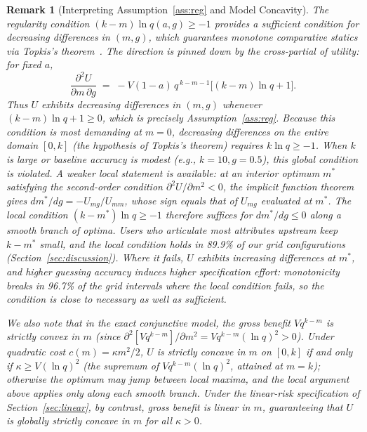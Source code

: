 \documentclass[11pt]{article}
\newtheorem{remark}{Remark}
\begin{document}
\begin{remark}[Interpreting Assumption~\ref{ass:reg} and Model Concavity]
\label{rmk:assumption1-audit}
The regularity condition $(k-m)\ln q(a,g) \ge -1$ provides a sufficient condition for decreasing differences in $(m,g)$, which guarantees monotone comparative statics via Topkis's theorem~\citep{topkis1978,topkis1998,milgrom-shannon1994}. The direction is pinned down by the cross-partial of utility: for fixed $a$,
\[
\frac{\partial^2 U}{\partial m\,\partial g} \;=\; -V(1-a)\,q^{\,k-m-1}\Big[(k-m)\ln q + 1\Big].
\]
Thus $U$ exhibits decreasing differences in $(m,g)$ whenever $(k-m)\ln q + 1 \ge 0$, which is precisely Assumption~\ref{ass:reg}. Because this condition is most demanding at $m = 0$, decreasing differences on the entire domain $[0, k]$ (the hypothesis of Topkis's theorem) requires $k\ln q \ge -1$. When $k$ is large or baseline accuracy is modest (e.g., $k=10, g=0.5$), this global condition is violated. A weaker local statement is available: at an interior optimum $m^*$ satisfying the second-order condition $\partial^2 U/\partial m^2 < 0$, the implicit function theorem gives $dm^*/dg = -U_{mg}/U_{mm}$, whose sign equals that of $U_{mg}$ evaluated at $m^*$. The local condition $(k - m^*)\ln q \ge -1$ therefore suffices for $dm^*/dg \le 0$ along a smooth branch of optima. Users who articulate most attributes upstream keep $k - m^*$ small, and the local condition holds in 89.9\% of our grid configurations (Section~\ref{sec:discussion}). Where it fails, $U$ exhibits increasing differences at $m^*$, and higher guessing accuracy induces \emph{higher} specification effort: monotonicity breaks in 96.7\% of the grid intervals where the local condition fails, so the condition is close to necessary as well as sufficient.

We also note that in the exact conjunctive model, the gross benefit $V q^{k-m}$ is strictly convex in $m$ (since $\partial^2 [V q^{k-m}]/\partial m^2 = V q^{k-m}(\ln q)^2 > 0$). Under quadratic cost $c(m) = \kappa m^2/2$, $U$ is strictly concave in $m$ on $[0,k]$ if and only if $\kappa \ge V (\ln q)^2$ (the supremum of $V q^{k-m}(\ln q)^2$, attained at $m = k$); otherwise the optimum may jump between local maxima, and the local argument above applies only along each smooth branch. Under the linear-risk specification of Section~\ref{sec:linear}, by contrast, gross benefit is linear in $m$, guaranteeing that $U$ is globally strictly concave in $m$ for all $\kappa > 0$.
\end{remark}
\end{document}

